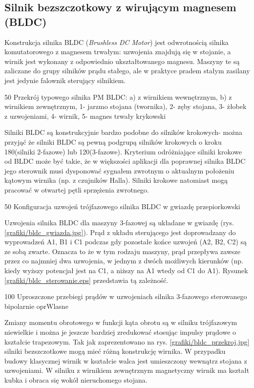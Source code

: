 \subsection{Silnik bezszczotkowy z wirującym magnesem (BLDC)}

Konstrukcja silnika BLDC ({\it Brushless DC Motor}) jest odwrotnością silnika komutatorowego z magnesem trwałym: uzwojenia znajdują się w stojanie, a wirnik jest wykonany z odpowiednio ukształtowanego magnesu. Maszyny te są zaliczane do grupy silników prądu stałego, ale w praktyce pradem stałym zasilany jest jedynie falownik sterujący silnikiem. 

		{50}
		{Przekrój typowego silnika PM BLDC: a) z wirnikiem wewnętrznym, b) z wirnikiem zewnętrznym, 1- jarzmo stojana (twornika), 2- zęby stojana, 3- żłobek z uzwojeniami, 4- wirnik, 5- magnes trwały}
		{krykowski}
		
Silniki BLDC są konstrukcyjnie bardzo podobne do silników krokowych- można przyjąć że silniki BLDC są pewną podgrupą silników krokowych o kroku 180\degree (silniki 2-fazowe) lub 120\degree (3-fazowe). Kryterium odróżniające silniki krokowe od BLDC może być takie, że w większości aplikacji dla poprawnej silnika BLDC jego sterownik musi dysponować sygnałem zwrotnym o aktualnym położeniu kątowym wirnika (np. z czujników Halla). Silniki krokowe natomiast mogą pracować w otwartej pętli sprzężenia zwrotnego.

		{50}
		{Konfiguracja uzwojeń trójfazowego silnika BLDC w gwiazdę}
		{przepiorkowski}
		
Uzwojenia silnika BLDC dla maszyny 3-fazowej są układane w gwiazdę (rys. \ref{grafiki/bldc_gwiazda.jpg}). Prąd z układu sterującego jest doprowadzany do wyprowadzeń A1, B1 i C1 podczas gdy pozostałe końce uzwojeń (A2, B2, C2) są ze sobą zwarte. Oznacza to że w tym rodzaju maszyny, prąd przepływa zawsze przez co najmniej dwa uzwojenia, w jednym z dwóch możliwych kierunków (np. kiedy wyższy potencjał jest na C1, a niższy na A1 wtedy od C1 do A1). Rysunek \ref{grafiki/bldc_sterowanie.eps} przedstawia tą zależność.

		{100}
		{Uproszczone przebiegi prądów w uzwojeniach silnika 3-fazowego sterowanego bipolarnie}
		{oprWlasne}
		
Zmiany momentu obrotowego w funkcji kąta obrotu są w silniku trójfazowym niewielkie i można je jeszcze bardziej zredukować stosując impulsy prądowe o kształcie trapezowym. 
Tak jak zaprezentowano na rys. \ref{grafiki/bldc_przekroj.jpg} silniki bezszczotkowe mogą mieć różną konstrukcję wirnika. W przypadku budowy klasycznej wirnik w kształcie walca jest umieszczony wewnątrz stojana z uzwojeniami. W silniku z wirnikiem zewnętrznym magnetyczny wirnik ma kształt kubka i obraca się wokół nieruchomego stojana. \\

